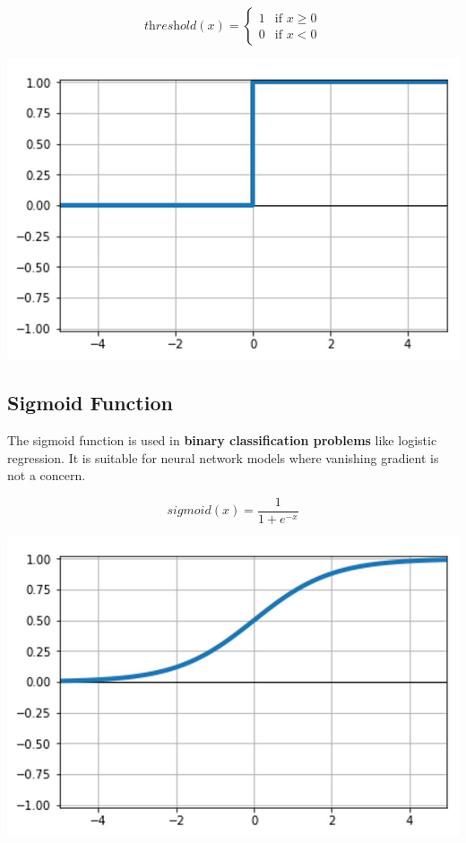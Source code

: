 \documentclass[12pt]{article}
\begin{document}
\begin{center}
\begin{minipage}[c]{0.45\textwidth}
\[
\textit{threshold}(x) = 
\begin{cases}
1 & \text{if } x \geq 0 \\
0 & \text{if } x < 0
\end{cases}
\]
\end{minipage}
\begin{minipage}[c]{0.40\textwidth}
\centering
\includegraphics[width=\linewidth]{images/lecture_04/img_4.png}
\end{minipage}
\end{center}

\subsection{Sigmoid Function}
The sigmoid function is used in \textbf{binary classification problems} like logistic regression. It is suitable for neural network models where vanishing gradient is not a concern.

\begin{center}
\begin{minipage}[c]{0.45\textwidth}
\[
\textit{sigmoid}(x) = \frac{1}{1 + e^{-x}}
\]
\end{minipage}
\begin{minipage}[c]{0.40\textwidth}
\centering
\includegraphics[width=\linewidth]{images/lecture_04/img_5.png}
\end{minipage}
\end{center}
\end{document}

